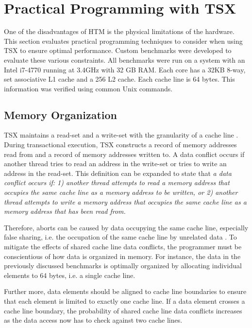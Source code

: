 \documentclass[a4paper]{article}
\begin{document}
\newpage
\section{\textbf{Practical Programming with TSX}}

\indent One of the disadvantages of HTM is the physical limitations of the
hardware.  This section evaluates practical programming techniques to consider
when using TSX to ensure optimal performance.  Custom benchmarks were developed
to evaluate these various constraints.  All benchmarks were run on a system with
an Intel i7-4770 running at 3.4GHz with 32 GB RAM.  Each core has a 32KB 8-way,
set associative L1 cache and a 256 L2 cache.  Each cache line is 64 bytes.  This
information was verified using common Unix commands.\par

\subsection{\textbf{Memory Organization}}

\indent TSX maintains a read-set and a write-set with the granularity of a cache line
\cite{intel_prog_man}.  During transactional execution, TSX constructs a
record of memory addresses read from and a record of memory addresses written
to.  A data conflict occurs if another thread tries to read an address in the
write-set or tries to write an address in the read-set.  This definition can be
expanded to state that \textit{a data conflict occurs if: 1) another thread attempts to
read a memory address that occupies the same cache line as a memory address to
be written, or 2) another thread attempts to write a memory address that
occupies the same cache line as a memory address that has been read from.}\par

\indent Therefore, aborts can be caused by data occupying the same cache line,
especially false sharing, i.e. the occupation of the same cache line by
unrelated data \cite{intel_opt_man}.  To mitigate the effects of shared
cache line data conflicts, the programmer must be conscientious of how data is
organized in memory.  For instance, the data in the previously discussed
benchmarks is optimally organized by allocating individual elements to 64 bytes,
i.e. a single cache line.\par

\indent Further more, data elements should be aligned to cache line boundaries
to ensure that each element is limited to exactly one cache line.  If a data
element crosses a cache line boundary, the probability of shared cache line data
conflicts increases as the data access now has to check against two cache lines.  
\end{document}
